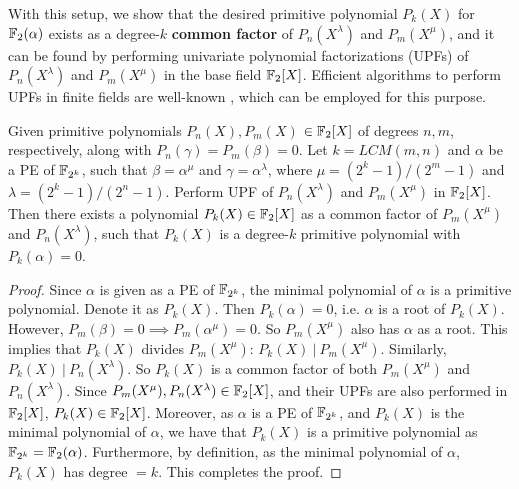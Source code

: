 With this setup, we show that the desired primitive polynomial
$P_k(X)$ for ${\mathbb{F}}_2(\alpha)$ exists as a degree-$k$ {\bf common factor}
of $P_n(X^{\lambda})$ and $P_m(X^{\mu})$, and it can be found by
performing univariate polynomial factorizations (UPFs) of
$P_n(X^{\lambda})$ and $P_m(X^{\mu})$ in the base field
${\mathbb{F}}_2[X]$. Efficient algorithms to perform UPFs in finite fields are
well-known \cite{factorization_fq:survey}, which can be employed for
this purpose. 

\begin{Theorem}\label{thm:Pk}
Given primitive polynomials $P_n(X), P_m(X)$ $\in {\mathbb{F}}_2[X]$ of degrees
$n,m$, respectively, along with $P_n(\gamma)= P_m(\beta)=0$. Let 
$k=LCM(m,n)$ and $\alpha$ be a PE of ${\mathbb{F}}_{2^k}$, such that
$\beta=\alpha^\mu$ and $\gamma=\alpha^\lambda$, where
$\mu={(2^k-1)/(2^m-1)}$ and $\lambda={(2^k-1)/(2^n-1)}$.
Perform UPF of $P_n(X^{\lambda})$ and $P_m(X^{\mu})$ in ${\mathbb{F}}_2[X]$. 
Then there exists a polynomial $P_k(X) \in {\mathbb{F}}_2[X]$ as a common factor
of $P_m(X^\mu)$ and $P_n(X^\lambda)$, such that $P_k(X)$ is a 
degree-$k$ primitive polynomial with $P_{k}(\alpha)=0$.
\end{Theorem}

\begin{proof}
Since %
$\alpha$ is given as a PE of ${\mathbb{F}}_{2^k}$,  the minimal polynomial of
$\alpha$ is a primitive polynomial. Denote it as $P_k(X)$. Then
$P_k(\alpha)=0$, i.e. $\alpha$ is a root of $P_k(X)$. However,
$P_m(\beta)=0 \implies P_m(\alpha^\mu)=0$. So $P_m(X^\mu)$ also has
$\alpha$ as a root. This implies that $P_k(X)$ divides $P_m(X^\mu)$:
$P_k(X) ~| ~ P_m(X^\mu)$. Similarly, $P_k(X) ~|~ P_n(X^\lambda)$. So
$P_k(X)$ is a common factor of both $P_m(X^\mu)$ and
$P_n(X^\lambda)$. Since $P_m(X^{\mu}), P_n(X^{\lambda}) \in {\mathbb{F}}_2[X]$,
and their UPFs are also performed in ${\mathbb{F}}_2[X]$, $P_k(X) \in
{\mathbb{F}}_2[X]$. Moreover, as $\alpha$ is a PE of ${\mathbb{F}}_{2^k}$, and $P_k(X)$ is the
minimal polynomial of $\alpha$, we have that $P_k(X)$ is a primitive
polynomial as ${\mathbb{F}}_{2^k} = {\mathbb{F}}_2(\alpha)$. Furthermore, by definition, as
the minimal polynomial of $\alpha$, $P_k(X)$ has degree
$=k$. This completes the proof. 
\end{proof}


